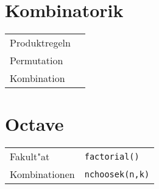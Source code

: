 \documentclass[ngerman, a4paper, 10pt, twocolumn, DIV20, headings=small]{scrartcl}
\begin{document}
\section{Kombinatorik}
\label{sec:kombinatorik}


\begin{tabular}{l l}
  Produktregeln &  \\
  Permutation &  \\
  Kombination & \\
\end{tabular}


\section{Octave}
\label{sec:octave}

\begin{tabular}{l l}
  Fakult"at & \verb|factorial()| \\
  Kombinationen & \verb|nchoosek(n,k)| \\
\end{tabular}
\end{document}
